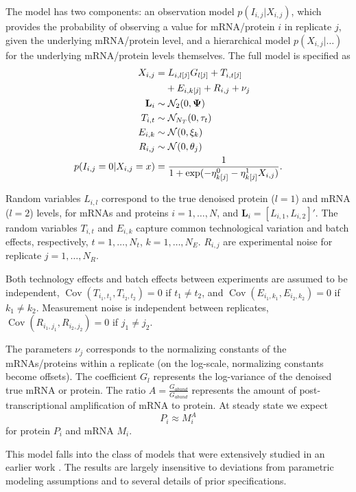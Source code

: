 \documentclass[10pt]{article}
\renewcommand{\l}{l}
\newcommand{\lj}{{\l[\raisebox{.7pt}{$\scriptstyle j$}]}}
\newcommand{\kj}{{k[\raisebox{.7pt}{$\scriptstyle j$}]}}
\newcommand{\tj}{{t[\raisebox{.7pt}{$\scriptstyle j$}]}}
\renewcommand{\vec}[1]{\boldsymbol{\mathbf{#1}}}
\newcommand{\mat}[1]{\boldsymbol{\mathbf{#1}}}
\DeclareMathOperator{\Cov}{Cov}
\begin{document}
The model has two components: an observation model
$p(I_{i,j}|X_{i,j})$, which provides the probability of observing
a value for mRNA/protein $i$ in replicate $j$, given the underlying
mRNA/protein level, and a hierarchical model
$p(X_{i,j}|\dots)$ for the underlying mRNA/protein levels themselves.
The full model is specified as
%
\begin{align}
\label{eq:X} X_{i,j} & = L_{i,\lj} G_{\lj} + T_{i,\tj} \nonumber\\
        & \phantom{{}=} + E_{i,\kj} + R_{i,j} + \nu_{j}  \\
\label{eq:L} \vec{L}_i & \sim \mathcal{N}_{2}(0,\mat\Psi)\\
\label{eq:T} T_{i,t} & \sim \mathcal{N}_{N_T}(0,\tau_{t})\\
\label{eq:P} E_{i,k} & \sim \mathcal{N}(0,\xi_{k})\\
\label{eq:M} R_{i,j} & \sim \mathcal{N}(0,\theta_{j})\\
\label{eq:obs} p(I_{i,j} = 0 |X_{i,j}=x) & =
   \frac{1}{1+\exp(-\eta^0_{\kj}-\eta^1_{\kj} X_{i,j})}.
\end{align}

Random variables $L_{i,\l}$ correspond to the true denoised protein
($l=1$) and mRNA ($l=2$) levels, for mRNAs and proteins
$i=1,\dots,N$, and $\vec{L}_i=[L_{i,1},L_{i,2}]'$.
The random variables $T_{i,t}$ and $E_{i,k}$ capture common
technological variation and batch effects, respectively,
$t=1,\dots,N_t$, $k=1,\dots,N_E$. $R_{i,j}$ are experimental noise for
replicate $j=1,\dots,N_R$. 

Both technology effects and batch effects between experiments are
assumed to be independent, $\Cov(T_{i_1,t_1},T_{i_2,t_2})=0$ if
$t_1\ne t_2$, and $\Cov(E_{i_1,k_1},E_{i_2,k_2})=0$ if $k_1\ne k_2$. 
Measurement noise is independent between replicates,
$\Cov(R_{i_1,j_1},R_{i_2,j_2})=0$ if $j_1\ne j_2$.

The parameters $\nu_{j}$ corresponds to the normalizing constants of
the mRNAs/proteins within a replicate (on the log-scale,
normalizing constants become offsets). The coefficient $G_{l}$
represents the log-variance of the denoised true mRNA or protein.  The
ratio $A = \frac{G_{abund}}{G_{abund}}$ represents the amount of
post-transcriptional amplification of mRNA to protein.  At steady
state we expect $$ P_i \approx M_i^A$$ for protein $P_i$ and mRNA
$M_i$.

This model falls into the class of models that were extensively studied
in an earlier work \cite{Franks2014}. The results are largely insensitive to deviations from
parametric modeling assumptions and to several details of prior specifications.
\end{document}
